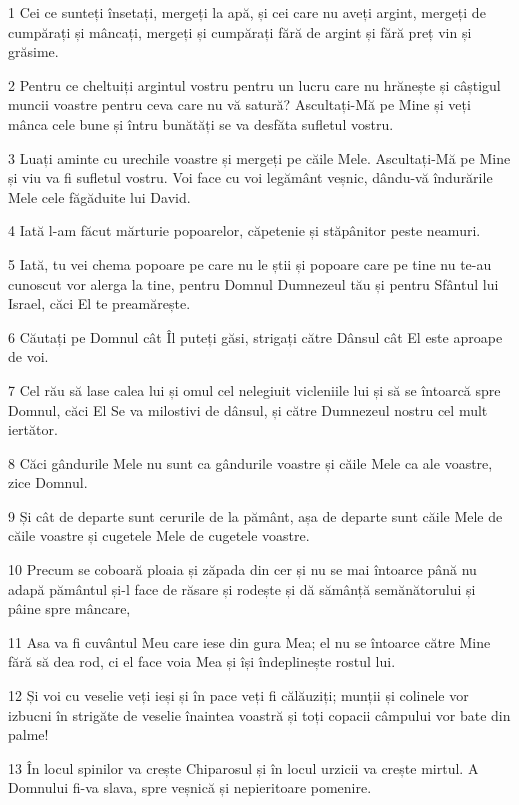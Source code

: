 \par 1 Cei ce sunteți însetați, mergeți la apă, și cei care nu aveți argint, mergeți de cumpărați și mâncați, mergeți și cumpărați fără de argint și fără preț vin și grăsime.
\par 2 Pentru ce cheltuiți argintul vostru pentru un lucru care nu hrănește și câștigul muncii voastre pentru ceva care nu vă satură? Ascultați-Mă pe Mine și veți mânca cele bune și întru bunătăți se va desfăta sufletul vostru.
\par 3 Luați aminte cu urechile voastre și mergeți pe căile Mele. Ascultați-Mă pe Mine și viu va fi sufletul vostru. Voi face cu voi legământ veșnic, dându-vă îndurările Mele cele făgăduite lui David.
\par 4 Iată l-am făcut mărturie popoarelor, căpetenie și stăpânitor peste neamuri.
\par 5 Iată, tu vei chema popoare pe care nu le știi și popoare care pe tine nu te-au cunoscut vor alerga la tine, pentru Domnul Dumnezeul tău și pentru Sfântul lui Israel, căci El te preamărește.
\par 6 Căutați pe Domnul cât Îl puteți găsi, strigați către Dânsul cât El este aproape de voi.
\par 7 Cel rău să lase calea lui și omul cel nelegiuit vicleniile lui și să se întoarcă spre Domnul, căci El Se va milostivi de dânsul, și către Dumnezeul nostru cel mult iertător.
\par 8 Căci gândurile Mele nu sunt ca gândurile voastre și căile Mele ca ale voastre, zice Domnul.
\par 9 Și cât de departe sunt cerurile de la pământ, așa de departe sunt căile Mele de căile voastre și cugetele Mele de cugetele voastre.
\par 10 Precum se coboară ploaia și zăpada din cer și nu se mai întoarce până nu adapă pământul și-l face de răsare și rodește și dă sămânță semănătorului și pâine spre mâncare,
\par 11 Asa va fi cuvântul Meu care iese din gura Mea; el nu se întoarce către Mine fără să dea rod, ci el face voia Mea și își îndeplinește rostul lui.
\par 12 Și voi cu veselie veți ieși și în pace veți fi călăuziți; munții și colinele vor izbucni în strigăte de veselie înaintea voastră și toți copacii câmpului vor bate din palme!
\par 13 În locul spinilor va crește Chiparosul și în locul urzicii va crește mirtul. A Domnului fi-va slava, spre veșnică și nepieritoare pomenire.

